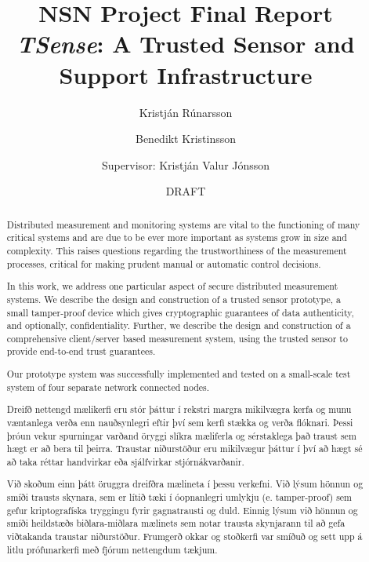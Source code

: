 \documentclass[10pt,titlepage,twoside,a4paper]{report}
\author{Kristj\'{a}n R\'{u}narsson \and Benedikt Kristinsson\\\and Supervisor: Kristj\'{a}n Valur J\'{o}nsson}
\title{NSN Project Final Report\\\textit{TSense}: A Trusted Sensor and Support Infrastructure}
\date{DRAFT}
\begin{document}
\maketitle
\newpage
\ \ \ \\
\newpage

\setcounter{page}{1}

\tableofcontents

\begin{abstract}
Distributed measurement and monitoring systems are vital to the functioning of many critical systems and are due to be ever more important as systems grow in size and complexity. This raises questions regarding the trustworthiness of the measurement processes, critical for making prudent manual or automatic control decisions. 

In this work, we address one particular aspect of secure distributed measurement systems. We describe the design and construction of a trusted sensor prototype, a small tamper-proof device which gives cryptographic guarantees of data authenticity, and optionally, confidentiality. Further, we describe the design and construction of a comprehensive client/server based measurement system, using the trusted sensor to provide end-to-end trust guarantees. 


%
Our prototype system was successfully implemented and tested on a small-scale test system of four separate network connected nodes.
\end{abstract}

\renewcommand{\abstractname}{{\'{U}}tdr\'{a}ttur}
\begin{abstract}
Dreifð nettengd mælikerfi eru stór þáttur í rekstri margra mikilvægra kerfa og munu væntanlega verða enn nauðsynlegri eftir því sem kerfi stækka og verða flóknari. Þessi þróun vekur spurningar varðand öryggi slíkra mæliferla og sérstaklega það traust sem hægt er að bera til þeirra. Traustar niðurstöður eru mikilvægur þáttur í því að hægt sé að taka réttar handvirkar eða sjálfvirkar stjórnákvarðanir.

Við skoðum einn þátt öruggra dreifðra mælineta í þessu verkefni. Við lýsum hönnun og smíði trausts skynara, sem er lítið tæki í óopnanlegri umlykju (e. tamper-proof) sem gefur kriptografíska tryggingu fyrir gagnatrausti og duld. Einnig lýsum við hönnun og smíði heildstæðs biðlara-miðlara mælinets sem  notar trausta skynjarann til að gefa viðtakanda traustar niðurstöður.
%
Frumgerð okkar og stoðkerfi var smíðuð og sett upp á litlu prófunarkerfi með fjórum nettengdum tækjum.
\end{abstract}

\setcounter{page}{1}
\pagestyle{headings}








\end{document}
